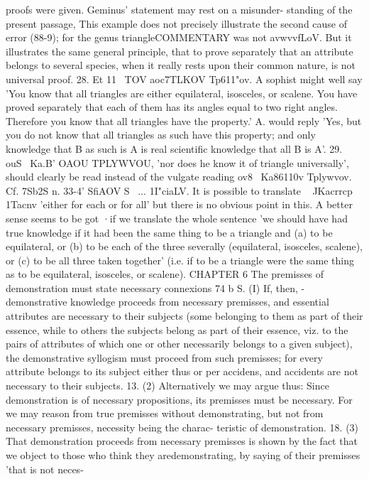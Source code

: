 {{{{{{proofs were given. Geminus' statement may rest on a misunder-
standing of the present passage, This example does not precisely
illustrate the second cause of error (88-9); for the genus triangleCOMMENTARY
was not avwvvfLoV. But it illustrates the same general principle,
that to prove separately that an attribute belongs to several
species, when it really rests upon their common nature, is not
universal proof.
28. Et 11~ TOV aoc\lLC7TLKOV Tp611"ov. A sophist might well say
'You know that all triangles are either equilateral, isosceles, or
scalene. You have proved separately that each of them has its
angles equal to two right angles. Therefore you know that all
triangles have the property.' A. would reply 'Yes, but you do
not know that all triangles as such have this property; and only
knowledge that B as such is A is real scientific knowledge that
all B is A'.
29. ouS~ Ka.B' OAOU TPLYWVOU, 'nor does he know it of triangle
universally', should clearly be read instead of the vulgate reading
ov8~ Ka86110v Tplywvov. Cf. 7Sb2S n.
33-4' SfiAOV S~ ... 1I"ciaLV. It is possible to translate ~ JKacrrcp
~ 1Tacnv 'either for each or for all' but there is no obvious point
in this. A better sense seems to be got ·if we translate the whole
sentence 'we should have had true knowledge if it had been the
same thing to be a triangle and (a) to be equilateral, or (b) to
be each of the three severally (equilateral, isosceles, scalene), or
(c) to be all three taken together' (i.e. if to be a triangle were the
same thing as to be equilateral, isosceles, or scalene).
CHAPTER 6
The premisses of demonstration must state necessary connexions
74 b S. (I) If, then, -demonstrative knowledge proceeds from
necessary premisses, and essential attributes are necessary to
their subjects (some belonging to them as part of their essence,
while to others the subjects belong as part of their essence, viz.
to the pairs of attributes of which one or other necessarily belongs
to a given subject), the demonstrative syllogism must proceed
from such premisses; for every attribute belongs to its subject
either thus or per accidens, and accidents are not necessary to
their subjects.
13. (2) Alternatively we may argue thus: Since demonstration
is of necessary propositions, its premisses must be necessary.
For we may reason from true premisses without demonstrating,
but not from necessary premisses, necessity being the charac-
teristic of demonstration.
18. (3) That demonstration proceeds from necessary premisses
is shown by the fact that we object to those who think they aredemonstrating, by saying of their premisses 'that is not neces-
}}}}}}
